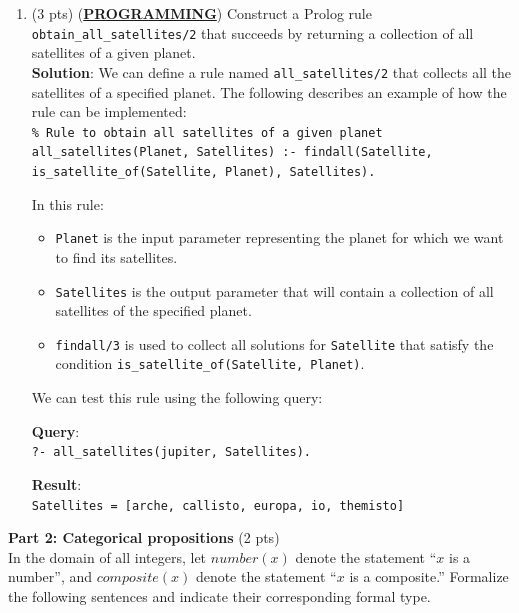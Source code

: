 \documentclass[12pt]{article}
\begin{document}
\begin{spacing}{1.5}
\begin{enumerate}
		\item
		      (3 pts) (\uline{\textbf{PROGRAMMING}}) Construct a Prolog rule \texttt{obtain\_all\_satellites/2}
		      that succeeds by returning a collection of all satellites of a given planet.\\
		      		      		      		      		      		      		      
		      \textbf{Solution}: We can define a rule named \texttt{all\_satellites/2} that collects all the satellites of a specified planet. The following describes an example of how the rule can be implemented:\\
		      		      		      		      		      		      		      
		      \texttt{\% Rule to obtain all satellites of a given planet}
		      \texttt{all\_satellites(Planet, Satellites) :- findall(Satellite, is\_satellite\_of(Satellite, Planet), Satellites).}
		      		      		      		      		      		      		      
		      In this rule:
		      \begin{itemize}
		      	\item \texttt{Planet} is the input parameter representing the planet for which we want to           find its satellites.
 
		      	\item \texttt{Satellites} is the output parameter that will contain a collection of all satellites of the specified planet.
 
		      	\item \texttt{findall/3} is used to collect all solutions for \texttt{Satellite} that satisfy the condition \texttt{is\_satellite\_of(Satellite, Planet)}.
		      \end{itemize}
		      		      		      		      		      		      		      
		      We can test this rule using the following query:
		      		      		      		      		      		      		      
		      \textbf{Query}:\\
		      \texttt{?- all\_satellites(jupiter, Satellites).}
		      		      		      		      		      		      		      
		      \textbf{Result}:\\
		      \texttt{Satellites = [arche, callisto, europa, io, themisto]}\\
	\end{enumerate}
							
	\noindent \textbf{Part 2: Categorical propositions} (2 pts)\\
	In the domain of all integers, let $number(x)$ denote the statement “$x$ is a number”, and $composite(x)$ denote the statement “$x$ is a composite.” Formalize the following sentences and indicate their corresponding formal type.\\
						

\end{spacing}
\end{document}
